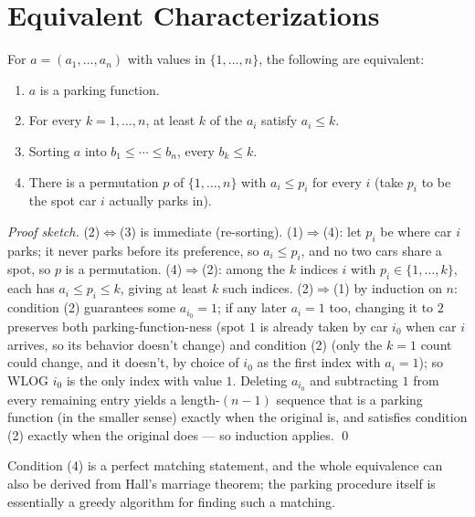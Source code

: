 \documentclass[11pt]{article}
\begin{document}
\section{Equivalent Characterizations}
\begin{theorembox}
For $a = (a_1,\ldots,a_n)$ with values in $\{1,\ldots,n\}$, the following
are equivalent:
\begin{enumerate}[leftmargin=1.5em]
  \item $a$ is a parking function.
  \item For every $k=1,\ldots,n$, at least $k$ of the $a_i$ satisfy
        $a_i \le k$.
  \item Sorting $a$ into $b_1 \le \cdots \le b_n$, every $b_k \le k$.
  \item There is a permutation $p$ of $\{1,\ldots,n\}$ with $a_i \le p_i$
        for every $i$ (take $p_i$ to be the spot car $i$ actually parks
        in).
\end{enumerate}

\emph{Proof sketch.} (2)$\Leftrightarrow$(3) is immediate (re-sorting).
(1)$\Rightarrow$(4): let $p_i$ be where car $i$ parks; it never parks
before its preference, so $a_i \le p_i$, and no two cars share a spot, so
$p$ is a permutation. (4)$\Rightarrow$(2): among the $k$ indices $i$ with
$p_i \in \{1,\ldots,k\}$, each has $a_i \le p_i \le k$, giving at least
$k$ such indices. (2)$\Rightarrow$(1) by induction on $n$: condition (2)
guarantees some $a_{i_0}=1$; if any later $a_i=1$ too, changing it to $2$
preserves both parking-function-ness (spot $1$ is already taken by car
$i_0$ when car $i$ arrives, so its behavior doesn't change) and condition
(2) (only the $k=1$ count could change, and it doesn't, by choice of
$i_0$ as the first index with $a_i=1$); so WLOG $i_0$ is the only index
with value $1$. Deleting $a_{i_0}$ and subtracting $1$ from every
remaining entry yields a length-$(n{-}1)$ sequence that is a parking
function (in the smaller sense) exactly when the original is, and
satisfies condition (2) exactly when the original does --- so induction
applies. \qed
\end{theorembox}

\begin{notebox}
Condition (4) is a perfect matching statement, and the whole equivalence
can also be derived from Hall's marriage theorem; the parking procedure
itself is essentially a greedy algorithm for finding such a matching.
\end{notebox}
\end{document}
